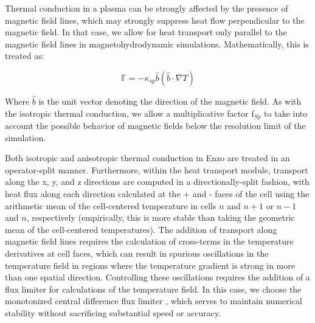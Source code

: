 Thermal conduction in a
plasma can be strongly affected by the presence of magnetic field
lines, which may strongly suppress heat flow perpendicular to the
magnetic field.  In that case, we allow for heat transport only
parallel to
the magnetic field lines in magnetohydrodynamic simulations.
Mathematically, this is treated as:

\begin{equation}
\mathbb{F} = -\kappa_{sp} \hat{b} (\hat{b} \cdot \nabla T)
\end{equation}

Where $\hat{b}$ is the unit vector denoting the direction of the
magnetic field.  As with the isotropic thermal conduction, we allow a
multiplicative factor f$_{Sp}$ to take into account the possible
behavior of magnetic fields below the resolution limit of the
simulation.

Both isotropic and anisotropic thermal conduction in Enzo are treated
in an operator-split manner.  Furthermore, within the heat transport
module, transport along the x, y, and z directions are computed in a
directionally-split fashion, with heat flux along each direction
calculated at the + and - faces of the cell using the arithmetic mean
of the cell-centered temperature in cells $n$ and $n+1$ or $n-1$ and
$n$, respectively (empirically, this is more stable than taking the
geometric mean of the cell-centered temperatures).  The addition of
transport along magnetic field lines requires the calculation of
cross-terms in the temperature derivatives at cell faces, which can
result in spurious oscillations in the temperature field in regions
where the temperature gradient is strong in more than one spatial
direction.  Controlling these oscillations requires the addition of a
flux limiter for calculations of the temperature field.  In this case,
we choose the monotonized central difference flux limiter
\citep{1977JCoPh..23..263V}, which serves to maintain numerical
stability without sacrificing substantial speed or accuracy.
